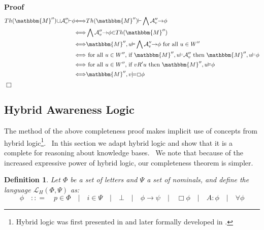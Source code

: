 \documentclass{acmconf}
\newenvironment{proof}{\noindent\textbf{Proof\ }}{\hspace*{\fill}$\Box$\medskip}
\newtheorem{definition}{Definition}
\begin{document}
\begin{proof}
  \begin{align*}
    Th({\mathbbm{M}}''){\cup}\mathcal{A}''_v{\vdash}{\phi} &
    {\Longleftrightarrow}Th({\mathbbm{M}}''){\vdash}\bigwedge\mathcal{A}''_v{\rightarrow}{\phi}\\
    &
    {\Longleftrightarrow}\bigwedge\mathcal{A}''_v{\rightarrow}{\phi}{\in}Th({\mathbbm{M}}'')\\
    &
    {\Longleftrightarrow}{\mathbbm{M}}'',u{\vDash}\bigwedge\mathcal{A}''_v{\rightarrow}{\phi}\text{
    for all $u \in W''$}\\
    & {\Longleftrightarrow}\text{ for all $u \in W''$, if
    }{\mathbbm{M}}'',u{\vDash}\mathcal{A}''_v\text{ then
    }{\mathbbm{M}}'',u{\vDash}{\phi}\\
    & {\Longleftrightarrow}\text{ for all $u \in W''$, if }v R 'u \text{ then
    }{\mathbbm{M}}'',u{\vDash}{\phi}\\
    & {\Longleftrightarrow}{\mathbbm{M}}'',v{\models}\Box{\phi}
  \end{align*}
\end{proof}

\subsection{Hybrid Awareness Logic}

The method of the above completeness proof makes implicit use of concepts from
hybrid logic{\footnote{Hybrid logic was first presented in
{\cite{prior_revised_1969}} and later formally developed in
{\cite{bull_approach_1970}}.}}. \ In this section we adapt hybrid logic and
show that it is a complete for reasoning about knowledge bases. \ We note that
because of the increased expressive power of hybrid logic, our completeness
theorem is simpler.

\begin{definition}
  Let $\Phi$ be a set of letters and $\Psi$ a set of nominals, and define the
  language $\mathcal{L}_H (\Phi, \Psi)$ as:
  \[ \phi \hspace{1em} : : = \hspace{1em} p \in \Phi \hspace{1em} |
     \hspace{1em} i \in \Psi \hspace{1em} | \hspace{1em} \bot \hspace{1em} |
     \hspace{1em} \phi \rightarrow \psi \hspace{1em} | \hspace{1em} \Box \phi
     \hspace{1em} | \hspace{1em} A : \phi \hspace{1em} | \hspace{1em} \forall
     \phi \]
\end{definition}
\end{document}

